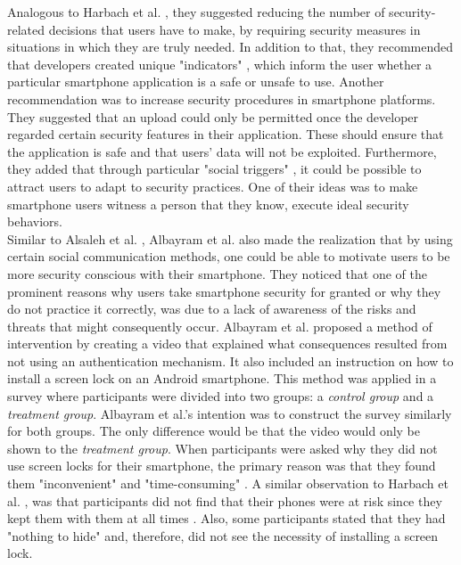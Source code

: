 Analogous to Harbach et al. \cite{harbach}, they suggested reducing the number of security-related decisions that users have to make, by requiring security measures in situations in which they are truly needed. In addition to that, they recommended that developers created unique "indicators" \cite{Alsaleh}, which inform the user whether a particular smartphone application is a safe or unsafe to use. Another  recommendation was to increase security procedures in smartphone platforms. They suggested that an upload could only be permitted once the developer regarded certain security features in their application.  These should ensure that the application is safe and that users' data will not be exploited. Furthermore, they added that through particular "social triggers" \cite{Alsaleh}, it could be possible to attract users to adapt to security practices. One of their ideas was to make smartphone users witness a person that they know, execute ideal security behaviors. \\

Similar to Alsaleh et al. \cite{Alsaleh}, Albayram et al. \cite{Albayram:2017:BUL:3235924.3235929} also made the realization that by using certain social communication methods, one could be able to motivate users to be more security conscious with their smartphone. They noticed that one of the prominent reasons why users take smartphone security for granted or why they do not practice it correctly, was due to a lack of awareness of the risks and threats that might consequently occur. Albayram et al. \cite{Albayram:2017:BUL:3235924.3235929} proposed a method of intervention by creating a video that explained what consequences resulted from not using an authentication mechanism. It also included an instruction on how to install a screen lock on an Android smartphone. This method was applied in a survey where participants were divided into two groups: a \textit{control group} and a \textit{treatment group}. Albayram et al.'s \cite{Albayram:2017:BUL:3235924.3235929} intention was to construct the survey similarly for both groups. The only difference would be that the video would only be shown to the \textit{treatment group}. When participants were asked why they did not use screen locks for their smartphone, the primary reason was that they found them "inconvenient" and "time-consuming" \cite{Albayram:2017:BUL:3235924.3235929}. A similar observation to Harbach et al. \cite{harbach}, was that participants did not find that their phones were at risk since they kept them with them at all times \cite{Albayram:2017:BUL:3235924.3235929}. Also, some participants stated that they had "nothing to hide" and, therefore, did not see the necessity of installing a screen lock.\\

